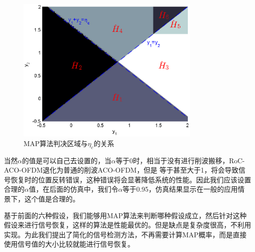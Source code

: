 \begin{figure}[htbp]
    \centering
    \includegraphics[width=0.8\textwidth]{figures/chapter-2/MAP_RoC_ACO_OFDM.eps}
    \caption{MAP算法判决区域与$\eta_c$的关系}
    \label{fig:MAP_RoC_ACO_OFDM}
\end{figure}
当然$\alpha$的值是可以自己去设置的，当$\alpha$等于0时，相当于没有进行削波搬移，RoC-ACO-OFDM退化为普通的削波ACO-OFDM，但是 等于甚至大于1，将会导致信号恢复时的位置反转错误，这种错误将会显著降低系统的性能。因此我们应该设置合理的$\alpha$值，在后面的仿真中，我们令$\alpha$等于0.95，仿真结果显示在一般的应用情景下，这个值是合理的。

基于前面的六种假设，我们能够用MAP算法来判断哪种假设成立，然后针对这种假设来进行信号恢复，这样的算法是性能最优的。但是缺点是复杂度很高，不利用实现。为此我们提出了简化的信号检测方法，不再需要计算MAP概率，而是直接使用信号值的大小比较就能进行信号恢复。

